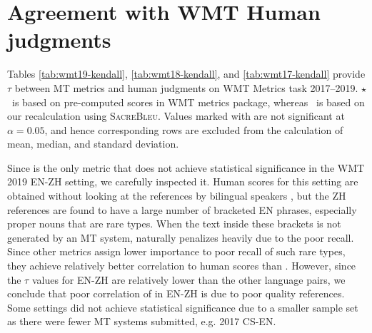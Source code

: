 

\section{Agreement with WMT Human judgments}
\label{sec:apphuman}

Tables \ref{tab:wmt19-kendall}, \ref{tab:wmt18-kendall}, and \ref{tab:wmt17-kendall} provide $\tau$ between MT metrics and human judgments on WMT Metrics task 2017--2019. 
$\star$\bleu\ is based on pre-computed scores in WMT metrics package, whereas \bleu\ is based on our recalculation using \textsc{SacreBleu}. 
Values marked with \insig are not significant at $\alpha=0.05$, and hence corresponding rows are excluded from the calculation of mean, median, and standard deviation.

Since  is the only metric that does not achieve statistical significance in the WMT 2019 EN-ZH setting, we carefully inspected it.
Human scores for this setting are obtained without looking at the references by bilingual speakers \cite{WMT19-metrics-proceedings}, but the ZH references are found to have a large number of bracketed EN phrases, especially proper nouns that are rare types.
When the text inside these brackets is not generated by an MT system,  naturally penalizes heavily due to the poor recall.
Since other metrics assign lower importance to poor recall of such rare types, they achieve relatively better correlation to human scores than . 
However, since the $\tau$ values for EN-ZH are relatively lower than the other language pairs, we conclude that poor correlation of  in EN-ZH is due to poor quality references.
Some settings did not achieve statistical significance due to a smaller sample set as there were fewer MT systems submitted, e.g. 2017 CS-EN.


